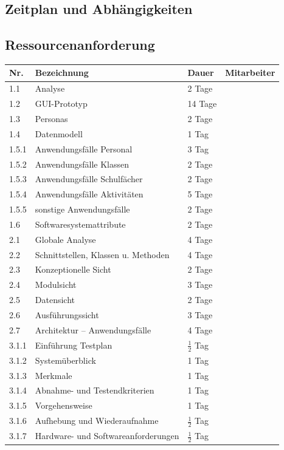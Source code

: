 \documentclass[fontsize=12pt,paper=a4,twoside]{scrartcl}
\begin{document}
\subsection{Zeitplan und Abhängigkeiten}


\subsection{Ressourcenanforderung}

\begin{tabularx}{\textwidth}{|p{1cm}|p{5.5cm}|p{2cm}|X|}
\hline \textbf{Nr.} &\textbf{Bezeichnung} & \textbf{Dauer} & \textbf{Mitarbeiter} \\
\hline 		1.1 	& Analyse		                		&	2 Tage		&  \\
\hline 		1.2 	& GUI-Prototyp                  		&	14 Tage		&  \\
\hline 		1.3 	& Personas	                    		&   2 Tage      &  \\
\hline 		1.4 	& Datenmodell	                		&   1 Tag       &  \\
\hline 		1.5.1 	& Anwendungsfälle Personal      		&   3 Tag	    &  \\
\hline 		1.5.2 	& Anwendungsfälle Klassen       		&   2 Tage      &  \\
\hline 		1.5.3 	& Anwendungsfälle Schulfächer			&	2 Tage		&  \\
\hline 		1.5.4 	& Anwendungsfälle Aktivitäten			&	5 Tage		&  \\
\hline 		1.5.5	& sonstige Anwendungsfälle      		&	2 Tage		&  \\
\hline 		1.6 	& Softwaresystemattribute       		&	2 Tage	    &  \\
\hline		2.1		& Globale Analyse						&	4 Tage		&  \\
\hline 		2.2		& Schnittstellen, Klassen u. Methoden 	& 	4 Tage		&  \\
\hline 		2.3		& Konzeptionelle Sicht					& 	2 Tage		&  \\
\hline		2.4		& Modulsicht							&   3 Tage		&  \\
\hline 		2.5		& Datensicht							& 	2 Tage		&  \\
\hline 		2.6		& Ausführungssicht						& 	3 Tage		&  \\
\hline		2.7		& Architektur -- Anwendungsfälle		&	4 Tage		&	\\
\hline		3.1.1	& Einführung Testplan					& $\frac{1}{2}$ Tag & \\
\hline 		3.1.2	& Systemüberblick						&   1 Tag		&  \\
\hline 		3.1.3	& Merkmale								&	1 Tag		&	\\
\hline 		3.1.4	& Abnahme- und Testendkriterien			&	1 Tag		&	\\
\hline 		3.1.5	& Vorgehensweise						&	1 Tag		&	\\
\hline 		3.1.6	& Aufhebung und Wiederaufnahme			& $\frac{1}{2}$ Tag	&	\\
\hline 		3.1.7	& Hardware- und Softwareanforderungen	&$\frac{1}{2}$ Tag	&	\\
\hline
\end{tabularx}\clearpage
\end{document}
